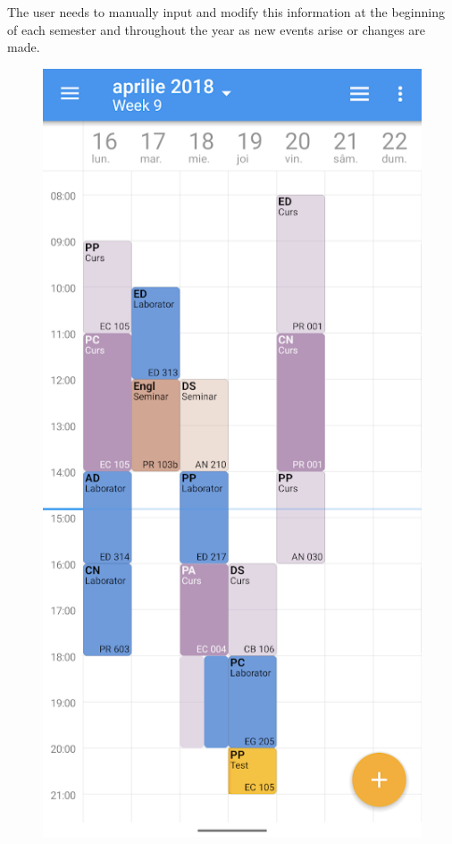         The user needs to manually input and modify this information at the beginning of each semester and throughout the year as new events arise or changes are made.
        
        \clearpage
        
        \begin{figure}[!h]
            \centering
                \begin{minipage}[b]{0.39\textwidth}
                    \captionsetup{justification=centering}
                    \includegraphics[width=\textwidth]{figures/uni_apps/features/school_assistant_timetable.png}

\end{minipage}
\end{figure}
